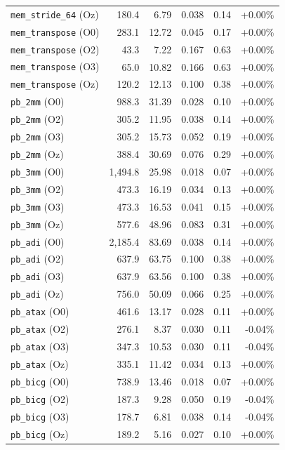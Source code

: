 {\begin{longtable}{lrrrrr}
\texttt{mem\_stride\_64} (Oz) & 180.4 & 6.79 & 0.038 & 0.14 & +0.00\% \\
\texttt{mem\_transpose} (O0) & 283.1 & 12.72 & 0.045 & 0.17 & +0.00\% \\
\texttt{mem\_transpose} (O2) & 43.3 & 7.22 & 0.167 & 0.63 & +0.00\% \\
\texttt{mem\_transpose} (O3) & 65.0 & 10.82 & 0.166 & 0.63 & +0.00\% \\
\texttt{mem\_transpose} (Oz) & 120.2 & 12.13 & 0.100 & 0.38 & +0.00\% \\
\texttt{pb\_2mm} (O0) & 988.3 & 31.39 & 0.028 & 0.10 & +0.00\% \\
\texttt{pb\_2mm} (O2) & 305.2 & 11.95 & 0.038 & 0.14 & +0.00\% \\
\texttt{pb\_2mm} (O3) & 305.2 & 15.73 & 0.052 & 0.19 & +0.00\% \\
\texttt{pb\_2mm} (Oz) & 388.4 & 30.69 & 0.076 & 0.29 & +0.00\% \\
\texttt{pb\_3mm} (O0) & 1,494.8 & 25.98 & 0.018 & 0.07 & +0.00\% \\
\texttt{pb\_3mm} (O2) & 473.3 & 16.19 & 0.034 & 0.13 & +0.00\% \\
\texttt{pb\_3mm} (O3) & 473.3 & 16.53 & 0.041 & 0.15 & +0.00\% \\
\texttt{pb\_3mm} (Oz) & 577.6 & 48.96 & 0.083 & 0.31 & +0.00\% \\
\texttt{pb\_adi} (O0) & 2,185.4 & 83.69 & 0.038 & 0.14 & +0.00\% \\
\texttt{pb\_adi} (O2) & 637.9 & 63.75 & 0.100 & 0.38 & +0.00\% \\
\texttt{pb\_adi} (O3) & 637.9 & 63.56 & 0.100 & 0.38 & +0.00\% \\
\texttt{pb\_adi} (Oz) & 756.0 & 50.09 & 0.066 & 0.25 & +0.00\% \\
\texttt{pb\_atax} (O0) & 461.6 & 13.17 & 0.028 & 0.11 & +0.00\% \\
\texttt{pb\_atax} (O2) & 276.1 & 8.37 & 0.030 & 0.11 & -0.04\% \\
\texttt{pb\_atax} (O3) & 347.3 & 10.53 & 0.030 & 0.11 & -0.04\% \\
\texttt{pb\_atax} (Oz) & 335.1 & 11.42 & 0.034 & 0.13 & +0.00\% \\
\texttt{pb\_bicg} (O0) & 738.9 & 13.46 & 0.018 & 0.07 & +0.00\% \\
\texttt{pb\_bicg} (O2) & 187.3 & 9.28 & 0.050 & 0.19 & -0.04\% \\
\texttt{pb\_bicg} (O3) & 178.7 & 6.81 & 0.038 & 0.14 & -0.04\% \\
\texttt{pb\_bicg} (Oz) & 189.2 & 5.16 & 0.027 & 0.10 & +0.00\% \\

\end{longtable}}
